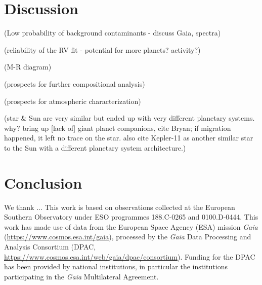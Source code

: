 \documentclass[modern]{aastex62}
\begin{document}
\section{Discussion}
\label{s:discussion}


(Low probability of background contaminants - discuss Gaia, spectra)

(reliability of the RV fit - potential for more planets? activity?)

(M-R diagram)

(prospects for further compositional analysis)

(prospects for atmospheric characterization)

(star \& Sun are very similar but ended up with very different planetary systems. why? bring up [lack of] giant planet companions, cite Bryan; if migration happened, it left no trace on the star. also cite Kepler-11 as another similar star to the Sun with a different planetary system architecture.)

\section{Conclusion}
\label{s:conclusion}


\acknowledgements
We thank ... 
This work is based on observations collected at the European Southern Observatory under ESO programmes 188.C-0265 and 0100.D-0444. 
This work has made use of data from the European Space Agency (ESA) mission
{\it Gaia} (\url{https://www.cosmos.esa.int/gaia}), processed by the {\it Gaia}
Data Processing and Analysis Consortium (DPAC,
\url{https://www.cosmos.esa.int/web/gaia/dpac/consortium}). Funding for the DPAC
has been provided by national institutions, in particular the institutions
participating in the {\it Gaia} Multilateral Agreement.





\end{document}
